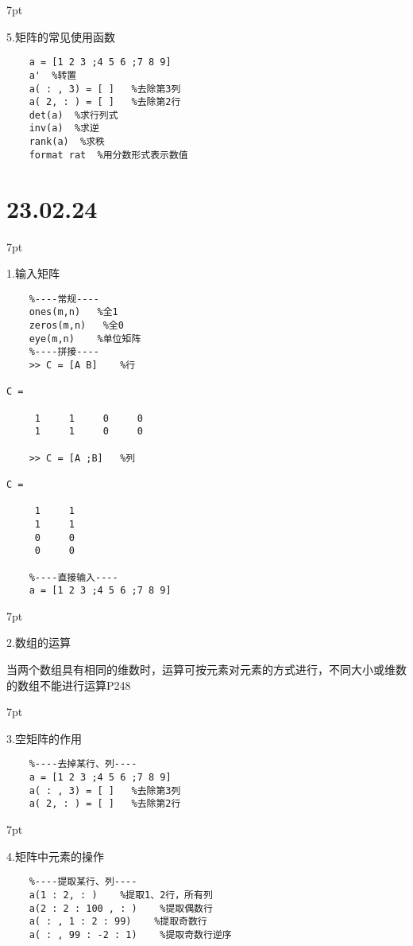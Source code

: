 \documentclass{article} %
\newenvironment{eg}{%
\def\FrameCommand{%
\hspace{1pt}%
{\color{Gray}\vrule width 2pt}%
{\color{egshade}\vrule width 4pt}%
\colorbox{egshade}%
}%
\MakeFramed{\advance\hsize-\width\FrameRestore}%
\noindent\hspace{-4.55pt}%
\begin{adjustwidth}{}{7pt}%
\vspace{2pt}\vspace{2pt}%
\normalfont %
}
{%
\vspace{2pt}\end{adjustwidth}\endMakeFramed%
}
\begin{document}
\begin{eg}
    5.矩阵的常见使用函数
\end{eg}
\begin{lstlisting}
    a = [1 2 3 ;4 5 6 ;7 8 9]
    a'  %转置
    a( : , 3) = [ ]   %去除第3列
    a( 2, : ) = [ ]   %去除第2行
    det(a)  %求行列式
    inv(a)  %求逆
    rank(a)  %求秩
    format rat  %用分数形式表示数值
\end{lstlisting}
\par
\newpage
\noindent \Large \section*{23.02.24} \par \normalsize
\begin{eg}
    1.输入矩阵
\end{eg}
\begin{lstlisting}
    %----常规----
    ones(m,n)   %全1
    zeros(m,n)   %全0
    eye(m,n)    %单位矩阵
    %----拼接----
    >> C = [A B]    %行

C =

     1     1     0     0
     1     1     0     0

    >> C = [A ;B]   %列
 
C =

     1     1
     1     1
     0     0
     0     0

    %----直接输入----
    a = [1 2 3 ;4 5 6 ;7 8 9]
\end{lstlisting}

\begin{eg}
    2.数组的运算

    当两个数组具有相同的维数时，运算可按元素对元素的方式进行，不同大小或维数的数组不能进行运算P248
\end{eg}

\begin{eg}
    3.空矩阵的作用
\end{eg}
\begin{lstlisting}
    %----去掉某行、列----
    a = [1 2 3 ;4 5 6 ;7 8 9]
    a( : , 3) = [ ]   %去除第3列
    a( 2, : ) = [ ]   %去除第2行  
\end{lstlisting}

\begin{eg}
    4.矩阵中元素的操作
\end{eg}
\begin{lstlisting}
    %----提取某行、列----
    a(1 : 2, : )    %提取1、2行，所有列
    a(2 : 2 : 100 , : )    %提取偶数行
    a( : , 1 : 2 : 99)    %提取奇数行
    a( : , 99 : -2 : 1)    %提取奇数行逆序
\end{lstlisting}
\end{document}
